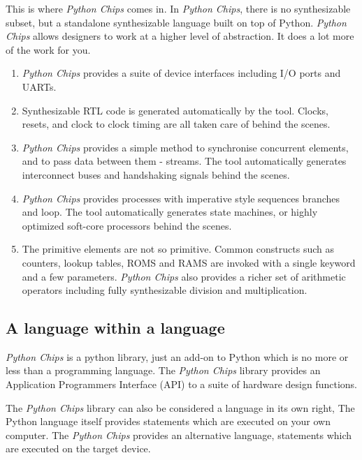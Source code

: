 \documentclass[letterpaper,10pt,english]{sphinxmanual}
\begin{document}
This is where \emph{Python Chips} comes in. In \emph{Python Chips}, there is no
synthesizable subset, but a standalone synthesizable language built on top
of Python. \emph{Python Chips} allows designers to work at a higher level of
abstraction. It does a lot more of the work for you.
\begin{enumerate}
\item {} 
\emph{Python Chips} provides a suite of device interfaces including
I/O ports and UARTs.

\item {} 
Synthesizable RTL code is generated automatically by the tool.
Clocks, resets, and clock to clock timing are all taken care of
behind the scenes.

\item {} 
\emph{Python Chips} provides a simple method to synchronise concurrent
elements, and to pass data between them - streams. The tool
automatically generates interconnect buses and handshaking
signals behind the scenes.

\item {} 
\emph{Python Chips} provides processes with imperative style
sequences branches and loop. The tool automatically generates
state machines, or highly optimized soft-core processors behind
the scenes.

\item {} 
The primitive elements are not so primitive. Common constructs
such as counters, lookup tables, ROMS and RAMS are invoked with a
single keyword and a few parameters. \emph{Python Chips} also provides
a richer set of arithmetic operators including fully
synthesizable division and multiplication.

\end{enumerate}


\subsection{A language within a language}
\label{introduction/index:a-language-within-a-language}
\emph{Python Chips} is a python library, just an add-on to Python which is no
more or less than a programming language. The \emph{Python Chips} library
provides an Application Programmers Interface (API) to a suite of hardware
design functions.

The \emph{Python Chips} library can also be considered a language in its own
right, The Python language itself provides statements which are executed on
your own computer. The \emph{Python Chips} provides an alternative language,
statements which are executed on the target device.
\end{document}
